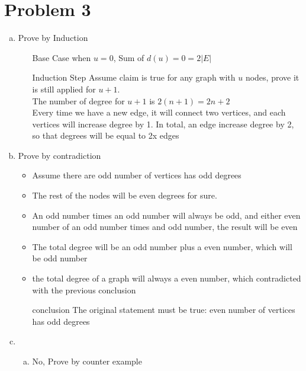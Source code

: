 \documentclass{article}
\def\math#1{$#1$}
\begin{document}
\section{Problem 3}
\begin{enumerate}[a)]
    \item Prove by Induction
        \begin{itemize}
            \item [Base Case] when \math{u = 0}, Sum of \math{d(u) = 0 = 2|E|}
            \item [Induction Step] Assume claim is true for any graph with \math{u} nodes, prove it is still applied for \math{u + 1}. \\
            The number of degree for \math{u + 1} is \math{2(n + 1) = 2n + 2} \\ 
            Every time we have a new edge, it will connect two vertices, and each vertices will increase degree by 1. In total, an edge increase degree by 2, so that degrees will be equal to 2x edges
        \end{itemize}
    \item Prove by contradiction
            \begin{itemize}
                \item Assume there are odd number of vertices has odd degrees
                \item The rest of the nodes will be even degrees for sure.
                \item An odd number times an odd number will always be odd, and either even number of an odd number times and odd number, the result will be even
                \item The total degree will be an odd number plus a even number, which will be odd number
                \item the total degree of a graph will always a even number, which contradicted with the previous conclusion
                \item [conclusion] The original statement must be true: even number of vertices has odd degrees
            \end{itemize}
    \item 
        \begin{enumerate}[a)]
            \item No, Prove by counter example \\ 


\end{enumerate}
\end{enumerate}
\end{document}
